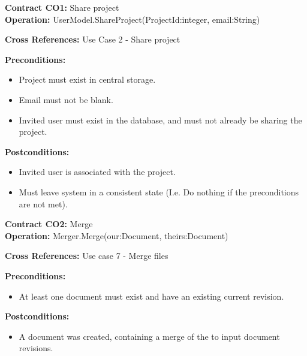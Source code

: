 \textbf{Contract CO1:} Share project \\

\textbf{Operation:} UserModel.ShareProject(ProjectId:integer, email:String)

\textbf{Cross References:} Use Case 2 - Share project

\textbf{Preconditions:} 

\begin{itemize}

    \item Project must exist in central storage.

    \item Email must not be blank.

    \item Invited user must exist in the database, and must not already be sharing the project.

\end{itemize}

\textbf{Postconditions:}

\begin{itemize}

    \item Invited user is associated with the project.

    \item Must leave system in a consistent state (I.e. Do nothing if the preconditions are not met).

\end{itemize}


\noindent \textbf{Contract CO2:} Merge \\

\textbf{Operation:} Merger.Merge(our:Document, theirs:Document)

\textbf{Cross References:} Use case 7 - Merge files

\textbf{Preconditions:}

\begin{itemize}
    \item At least one document must exist and have an existing current revision.
\end{itemize}

\textbf{Postconditions:}

\begin{itemize}
    \item A document was created, containing a merge of the to input document revisions.
\end{itemize}

